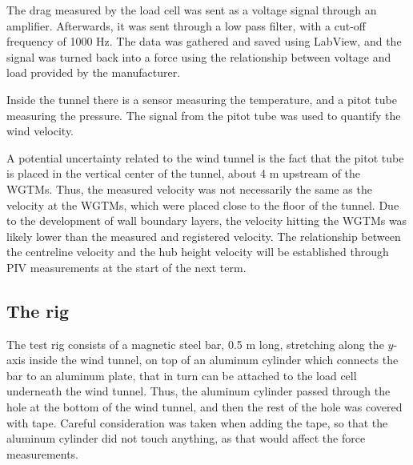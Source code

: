 
The drag measured by the load cell was sent as a voltage signal through an amplifier. Afterwards, it was sent through a low pass filter, with a cut-off frequency of 1000 Hz. The data was gathered and saved using LabView, and the signal was turned back into a force using the relationship between voltage and load provided by the manufacturer. 

Inside the tunnel there is a sensor measuring the temperature, and a pitot tube measuring the pressure. The signal from the pitot tube was used to quantify the wind velocity. 
% 

A potential uncertainty related to the wind tunnel is the fact that the pitot tube is placed in the vertical center of the tunnel, about 4 \si{\m} upstream of the \gls{WGTM}s. Thus, the measured velocity was not necessarily the same as the velocity at the \gls{WGTM}s, which were placed close to the floor of the tunnel. Due to the development of wall boundary layers, the velocity hitting the \gls{WGTM}s was likely lower than the measured and registered velocity. The relationship between the centreline velocity and the hub height velocity will be established through \gls{PIV} measurements at the start of the next term.


\subsection{The rig} 
The test rig consists of a magnetic steel bar, 0.5 \si{\m} long, stretching along the $y$-axis inside the wind tunnel, on top of an aluminum cylinder which connects the bar to an aluminum plate, that in turn can be attached to the load cell underneath the wind tunnel. Thus, the aluminum cylinder passed through the hole at the bottom of the wind tunnel, and then the rest of the hole was covered with tape. Careful consideration was taken when adding the tape, so that the aluminum cylinder did not touch anything, as that would affect the force measurements. 

